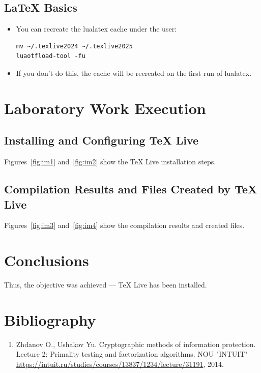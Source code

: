 \documentclass{article}
\begin{document}
\subsection{LaTeX Basics}
\begin{itemize}
\item You can recreate the lualatex cache under the user:
\begin{verbatim}
mv ~/.texlive2024 ~/.texlive2025
luaotfload-tool -fu
\end{verbatim}
\item If you don't do this, the cache will be recreated on the first run of lualatex.
\end{itemize}

\section{Laboratory Work Execution}

\subsection{Installing and Configuring TeX Live}

Figures~\ref{fig:im1} and~\ref{fig:im2} show the TeX Live installation steps.

\subsection{Compilation Results and Files Created by TeX Live}

Figures~\ref{fig:im3} and~\ref{fig:im4} show the compilation results and created files.

\section{Conclusions}
Thus, the objective was achieved — TeX Live has been installed.

\section{Bibliography}

\begin{enumerate}
\item Zhdanov O., Ushakov Yu. Cryptographic methods of information protection. Lecture 2: Primality testing and factorization algorithms. NOU "INTUIT" \url{https://intuit.ru/studies/courses/13837/1234/lecture/31191}, 2014.
\end{enumerate}
\end{document}
